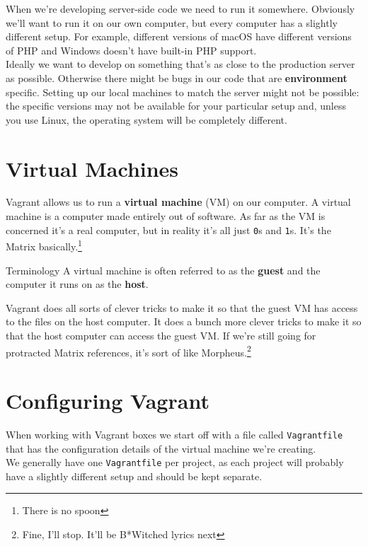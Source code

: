 When we're developing server-side code we need to run it somewhere. Obviously we'll want to run it on our own computer, but every computer has a slightly different setup. For example, different versions of macOS have different versions of PHP and Windows doesn't have built-in PHP support.
\\

Ideally we want to develop on something that's as close to the production server as possible. Otherwise there might be bugs in our code that are \textbf{environment} specific. Setting up our local machines to match the server might not be possible: the specific versions may not be available for your particular setup and, unless you use Linux, the operating system will be completely different.


\section{Virtual Machines}

Vagrant allows us to run a \textbf{virtual machine} (VM) on our computer. A virtual machine is a computer made entirely out of software. As far as the VM is concerned it's a real computer, but in reality it's all just \texttt{0}s and \texttt{1}s. It's the Matrix basically.\footnote{There is no spoon}
\\

\begin{infobox}{Terminology}
    A virtual machine is often referred to as the \textbf{guest} and the computer it runs on as the \textbf{host}.
\end{infobox}

Vagrant does all sorts of clever tricks to make it so that the guest VM has access to the files on the host computer. It does a bunch more clever tricks to make it so that the host computer can access the guest VM. If we're still going for protracted Matrix references, it's sort of like Morpheus.\footnote{Fine, I'll stop. It'll be B*Witched lyrics next\textellipsis}


\section{Configuring Vagrant}

When working with Vagrant boxes we start off with a file called \texttt{Vagrantfile} that has the configuration details of the virtual machine we're creating.
\\

We generally have one \texttt{Vagrantfile} per project, as each project will probably have a slightly different setup and should be kept separate.
\\

